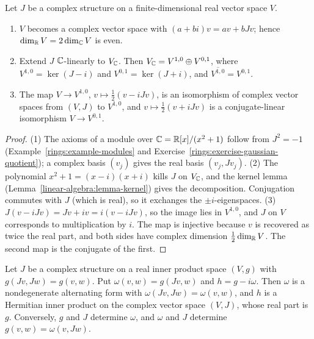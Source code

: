 \begin{proposition}\label{linear-algebra:proposition-complex-structure}
Let $J$ be a complex structure on a finite-dimensional real vector space $V$.
\begin{enumerate}
\item $V$ becomes a complex vector space with $(a + bi)v = av + bJv$; hence $\dim_{\mathbb{R}} V = 2\dim_{\mathbb{C}} V$ is even.
\item Extend $J$ $\mathbb{C}$-linearly to $V_{\mathbb{C}}$. Then $V_{\mathbb{C}} = V^{1,0} \oplus V^{0,1}$, where
$V^{1,0} = \ker(J - i)$ and $V^{0,1} = \ker(J + i)$, and $\overline{V^{1,0}} = V^{0,1}$.
\item The map $V \to V^{1,0}$, $v \mapsto \frac12(v - iJv)$, is an isomorphism of complex vector spaces from
$(V, J)$ to $V^{1,0}$, and $v \mapsto \frac12(v + iJv)$ is a conjugate-linear isomorphism $V \to V^{0,1}$.
\end{enumerate}
\end{proposition}

\begin{proof}
(1) The axioms of a module over $\mathbb{C} = \mathbb{R}[x]/(x^2 + 1)$ follow from $J^2 = -1$
(Example~\ref{rings:example-modules} and Exercise~\ref{rings:exercise-gaussian-quotient}); a complex basis
$(v_j)$ gives the real basis $(v_j, Jv_j)$.
(2) The polynomial $x^2 + 1 = (x - i)(x + i)$ kills $J$ on $V_{\mathbb{C}}$, and the kernel lemma
(Lemma~\ref{linear-algebra:lemma-kernel}) gives the decomposition. Conjugation commutes with $J$ (which is
real), so it exchanges the $\pm i$-eigenspaces.
(3) $J(v - iJv) = Jv + iv = i(v - iJv)$, so the image lies in $V^{1,0}$, and $J$ on $V$ corresponds to
multiplication by $i$. The map is injective because $v$ is recovered as twice the real part, and both sides
have complex dimension $\frac12\dim_{\mathbb{R}} V$. The second map is the conjugate of the first.
\end{proof}

\begin{proposition}\label{linear-algebra:proposition-compatible-metric}
Let $J$ be a complex structure on a real inner product space $(V, g)$ with $g(Jv, Jw) = g(v, w)$. Put
$\omega(v, w) = g(Jv, w)$ and $h = g - i\omega$. Then $\omega$ is a nondegenerate alternating form with
$\omega(Jv, Jw) = \omega(v, w)$, and $h$ is a Hermitian inner product on the complex vector space $(V, J)$, whose
real part is $g$. Conversely, $g$ and $J$ determine $\omega$, and $\omega$ and $J$ determine
$g(v, w) = \omega(v, Jw)$.
\end{proposition}

